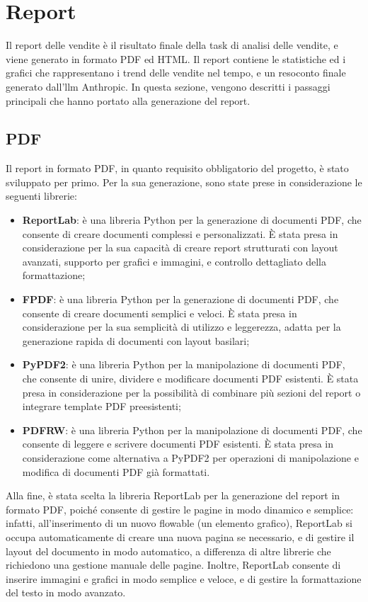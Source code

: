 \section{Report}

Il report delle vendite è il risultato finale della task di analisi delle vendite, e viene generato in formato PDF ed HTML. Il report contiene le statistiche ed i grafici che rappresentano i trend delle vendite nel tempo, e un resoconto finale generato dall'\gls{llm} Anthropic.
In questa sezione, vengono descritti i passaggi principali che hanno portato alla generazione del report.

\subsection{PDF}

Il report in formato PDF, in quanto requisito obbligatorio del progetto, è stato sviluppato per primo. Per la sua generazione, sono state prese in considerazione le seguenti librerie:
\begin{itemize}
    \item \textbf{ReportLab}: è una libreria Python per la generazione di documenti PDF, che consente di creare documenti complessi e personalizzati. È stata presa in considerazione per la sua capacità di creare report strutturati con layout avanzati, supporto per grafici e immagini, e controllo dettagliato della formattazione;
    \item \textbf{FPDF}: è una libreria Python per la generazione di documenti PDF, che consente di creare documenti semplici e veloci. È stata presa in considerazione per la sua semplicità di utilizzo e leggerezza, adatta per la generazione rapida di documenti con layout basilari;
    \item \textbf{PyPDF2}: è una libreria Python per la manipolazione di documenti PDF, che consente di unire, dividere e modificare documenti PDF esistenti. È stata presa in considerazione per la possibilità di combinare più sezioni del report o integrare template PDF preesistenti;
    \item \textbf{PDFRW}: è una libreria Python per la manipolazione di documenti PDF, che consente di leggere e scrivere documenti PDF esistenti. È stata presa in considerazione come alternativa a PyPDF2 per operazioni di manipolazione e modifica di documenti PDF già formattati.
\end{itemize}

Alla fine, è stata scelta la libreria ReportLab per la generazione del report in formato PDF, poiché consente di gestire le pagine in modo dinamico e semplice: infatti, all'inserimento di un nuovo flowable (un elemento grafico), ReportLab si occupa automaticamente di creare una nuova pagina se necessario, e di gestire il layout del documento in modo automatico, a differenza di altre librerie che richiedono una gestione manuale delle pagine. Inoltre, ReportLab consente di inserire immagini e grafici in modo semplice e veloce, e di gestire la formattazione del testo in modo avanzato.

